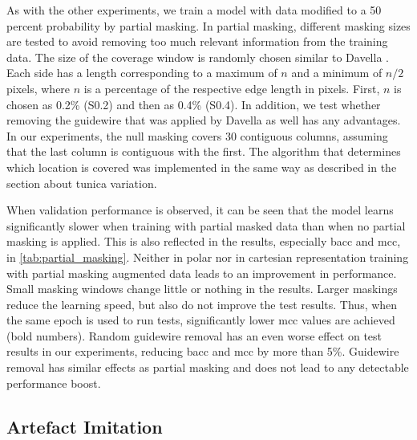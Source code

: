 As with the other experiments, we train a model with data modified to a 50 percent probability by partial masking. In partial masking, different masking sizes are tested to avoid removing too much relevant information from the training data. The size of the coverage window is randomly chosen similar to Davella \cite{Devalla.2018}. Each side has a length corresponding to a maximum of \( n \) and a minimum of \( n/2 \) pixels, where \( n \) is a percentage of the respective edge length in pixels. First, \( n \) is chosen as 0.2\% (S0.2) and then as 0.4\% (S0.4). In addition, we test whether removing the guidewire that was applied by Davella \cite{Devalla.2018} as well has any advantages. In our experiments, the null masking covers 30 contiguous columns, assuming that the last column is contiguous with the first. The algorithm that determines which location is covered was implemented in the same way as described in the section about tunica variation.

When validation performance is observed, it can be seen that the model learns significantly slower when training with partial masked data than when no partial masking is applied. This is also reflected in the results, especially \acrshort{bacc} and \acrshort{mcc}, in \cref{tab:partial_masking}. Neither in polar nor in cartesian representation training with partial masking augmented data leads to an improvement in performance. Small masking windows change little or nothing in the results. Larger maskings reduce the learning speed, but also do not improve the test results. Thus, when the same epoch is used to run tests, significantly lower \acrshort{mcc} values are achieved (bold numbers). Random guidewire removal has an even worse effect on test results in our experiments, reducing \acrshort{bacc} and \acrshort{mcc} by more than 5\%. Guidewire removal has similar effects as partial masking and does not lead to any detectable performance boost.


\subsection{Artefact Imitation}

